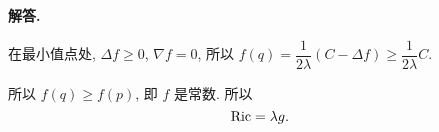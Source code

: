 \documentclass{ctexart}
\newenvironment{solution}{\par\noindent\textbf{解答. }}{\par}
\begin{document}
\begin{solution}
\begin{enumerate}
        在最小值点处, $\Delta f \geqslant 0$, $\nabla f = 0$, 所以 $f(q) = \dfrac{1}{2\lambda}(C - \Delta f) \geqslant \dfrac{1}{2\lambda}C$.

        所以 $f(q) \geqslant f(p)$, 即 $f$ 是常数. 所以
        \[
            \mathrm{Ric} = \lambda g.
        \]
    \end{enumerate}
\end{solution}
\end{document}
